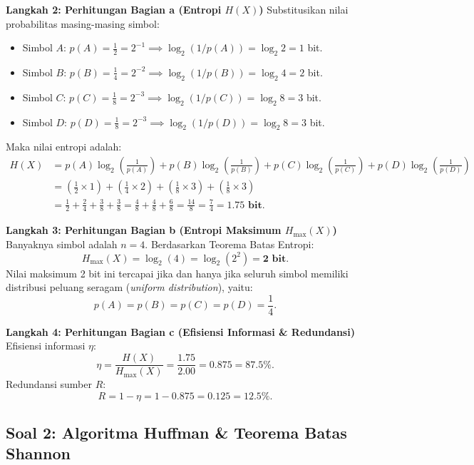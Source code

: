 \documentclass[11pt,a4paper]{article}
\begin{document}
\noindent\textbf{Langkah 2: Perhitungan Bagian a (Entropi $H(X)$)}
Substitusikan nilai probabilitas masing-masing simbol:
\begin{itemize}
    \item Simbol $A$: $p(A) = \frac{1}{2} = 2^{-1} \implies \log_2(1/p(A)) = \log_2 2 = 1$ bit.
    \item Simbol $B$: $p(B) = \frac{1}{4} = 2^{-2} \implies \log_2(1/p(B)) = \log_2 4 = 2$ bit.
    \item Simbol $C$: $p(C) = \frac{1}{8} = 2^{-3} \implies \log_2(1/p(C)) = \log_2 8 = 3$ bit.
    \item Simbol $D$: $p(D) = \frac{1}{8} = 2^{-3} \implies \log_2(1/p(D)) = \log_2 8 = 3$ bit.
\end{itemize}
Maka nilai entropi adalah:
\begin{align*}
H(X) &= p(A)\log_2\left(\frac{1}{p(A)}\right) + p(B)\log_2\left(\frac{1}{p(B)}\right) + p(C)\log_2\left(\frac{1}{p(C)}\right) + p(D)\log_2\left(\frac{1}{p(D)}\right) \\
&= \left(\frac{1}{2} \times 1\right) + \left(\frac{1}{4} \times 2\right) + \left(\frac{1}{8} \times 3\right) + \left(\frac{1}{8} \times 3\right) \\
&= \frac{1}{2} + \frac{2}{4} + \frac{3}{8} + \frac{3}{8} = \frac{4}{8} + \frac{4}{8} + \frac{6}{8} = \frac{14}{8} = \frac{7}{4} = \mathbf{1.75\text{ bit}}.
\end{align*}

\noindent\textbf{Langkah 3: Perhitungan Bagian b (Entropi Maksimum $H_{\max}(X)$)}
Banyaknya simbol adalah $n = 4$. Berdasarkan Teorema Batas Entropi:
\[
H_{\max}(X) = \log_2(4) = \log_2(2^2) = \mathbf{2\text{ bit}}.
\]
Nilai maksimum 2 bit ini tercapai jika dan hanya jika seluruh simbol memiliki distribusi peluang seragam (\textit{uniform distribution}), yaitu:
\[
p(A) = p(B) = p(C) = p(D) = \frac{1}{4}.
\]

\noindent\textbf{Langkah 4: Perhitungan Bagian c (Efisiensi Informasi \& Redundansi)}
Efisiensi informasi $\eta$:
\[
\eta = \frac{H(X)}{H_{\max}(X)} = \frac{1.75}{2.00} = \mathbf{0.875} = \mathbf{87.5\%}.
\]
Redundansi sumber $R$:
\[
R = 1 - \eta = 1 - 0.875 = \mathbf{0.125} = \mathbf{12.5\%}.
\]

\vspace{0.4cm}

\subsection{Soal 2: Algoritma Huffman \& Teorema Batas Shannon}
\end{document}
